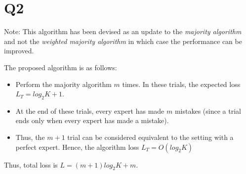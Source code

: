 \section{Q2}
\label{s:Q2}
Note: This algorithm has been devised as an update to the \emph{majority algorithm} and not the \emph{weighted majority algorithm} in which case the performance can be improved.

The proposed algorithm is as follows:


\begin{itemize}[label=$\circ$, leftmargin = *]
\item Perform the majority algorithm $m$ times. In these trials, the expected loss $L_T = log_{2}K + 1$.
\item At the end of these trials, every expert has made $m$ mistakes (since a trial ends only when every expert has made a mistake). 
\item Thus, the $m+1$ trial can be considered equivalent to the setting with a perfect expert. Hence, the algorithm loss $L_T = O(log_{2}K)$
\end{itemize}
Thus, total loss is $L = (m+1)log_{2}K + m$.